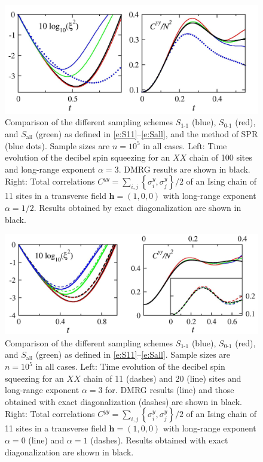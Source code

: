 \documentclass[aps,prl,showpacs,amsmath,amssymb,superscriptaddress,reprint,10pt]{revtex4-1}
\newcommand{\mvec}[1]{\boldsymbol #1}
\begin{document}
\begin{figure}\centering
\includegraphics[width=\linewidth]{./XY_TF_compare_samplings.jpg}
\caption{\label{f:sampling}%
Comparison of the different sampling schemes $S_{\text{1-1}}$ (blue), $S_{\text{0-1}}$ (red), and $S_{\text{all}}$ (green) as defined in \eqref{e:S11}--\eqref{e:Sall}, and the method of SPR (blue dots). Sample sizes are $n=10^5$ in all cases. Left: Time evolution of the decibel spin squeezing for an $XX$ chain of 100 sites and long-range exponent $\alpha=3$. DMRG results are shown in black. Right: Total correlations $C^{yy}=\sum_{i,j}\left\{\sigma_i^y,\sigma_j^y\right\}/2$ of an Ising chain of 11 sites in a transverse field $\mvec{h}=(1,0,0)$ with long-range exponent $\alpha=1/2$. Results obtained by exact diagonalization are shown in black.
}%
\end{figure}

\begin{figure}\centering
\includegraphics[width=\linewidth]{./benchmark_sizes_XY_alpha_TF.jpg}
\caption{\label{f:sampling_2}%
Comparison of the different sampling schemes $S_{\text{1-1}}$ (blue), $S_{\text{0-1}}$ (red), and $S_{\text{all}}$ (green) as defined in \eqref{e:S11}--\eqref{e:Sall}. Sample sizes are $n=10^5$ in all cases. Left: Time evolution of the decibel spin squeezing for an $XX$ chain of 11 (dashes) and 20 (line) sites and long-range exponent $\alpha=3$ for. DMRG results (line) and those obtained with exact diagonalization (dashes) are shown in black. Right: Total correlations $C^{yy}=\sum_{i,j}\left\{\sigma_i^y,\sigma_j^y\right\}/2$ of an Ising chain of 11 sites in a transverse field $\mvec{h}=(1,0,0)$ with long-range exponent $\alpha=0$ (line) and $\alpha=1$ (dashes). Results obtained with exact diagonalization are shown in black.
}%
\end{figure}
\end{document}
